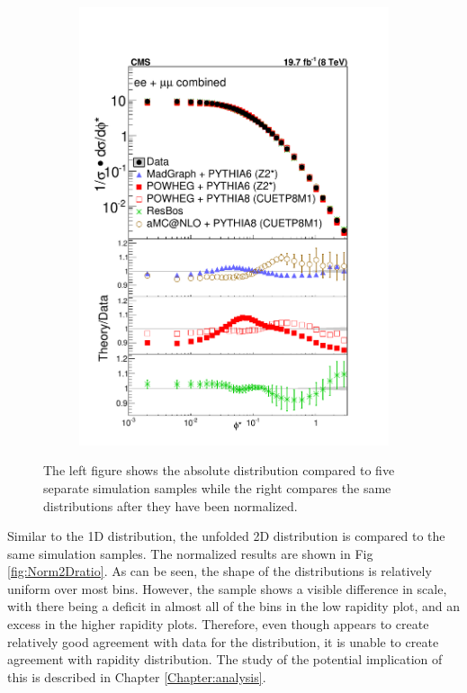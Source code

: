 \begin{figure}
\begin{subfigure}[b]{0.49\textwidth}
    \includegraphics[width=\linewidth]{figures/Results/Unfolded1DNormalized.pdf}
    \end{subfigure}
    \caption{The left figure shows the absolute \phistar distribution compared to five separate simulation samples while the right compares the same distributions after they have been normalized.}
    \label{fig:Unfolded1DResults}
\end{figure}

Similar to the 1D distribution, the unfolded 2D distribution is compared to the same simulation samples. The normalized results are shown in Fig \ref{fig:Norm2Dratio}. As can be seen, the shape of the distributions is relatively uniform over most \rapidity bins. However, the \MADGRAPH sample shows a visible difference in scale, with there being a deficit in almost all of the \phistar bins in the low rapidity plot, and an excess in the higher rapidity plots. Therefore, even though \MADGRAPH appears to create relatively good agreement with data for the \phistar distribution, it is unable to create agreement with rapidity distribution. The study of the potential implication of this is described in Chapter \ref{Chapter:analysis}.


